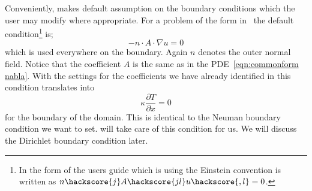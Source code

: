 Conveniently, \esc makes default assumption on the boundary conditions which the user may modify where appropriate. 
For a problem of the form in~ the default condition\footnote{In the form of the \esc users guide which is using the Einstein convention is written as 
$n\hackscore{j}A\hackscore{jl} u\hackscore{,l}=0$.} is;
\begin{equation}\label{NEUMAN 2}
-n\cdot A \cdot\nabla u = 0 
\end{equation}
which is used everywhere on the boundary. Again $n$ denotes the outer normal field. 
Notice that the coefficient $A$ is the same as in the \esc PDE~\ref{eqn:commonform nabla}. 
With the settings for the coefficients we have already identified in  this
condition translates into 
\begin{equation}\label{NEUMAN 2b}
\kappa \frac{\partial T}{\partial x} = 0 
\end{equation}
for the boundary of the domain. This is identical to the Neuman boundary condition we want to set. \esc will take care of this condition for us. We will discuss the Dirichlet boundary condition later.

